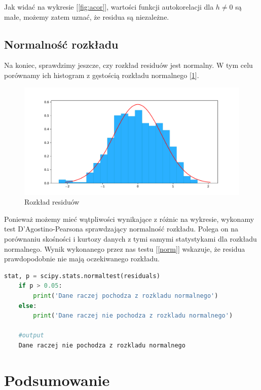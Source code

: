 \documentclass{article}
\theoremstyle{break}
\begin{document}
Jak widać na wykresie [\ref{fig:acor}], wartości funkcji autokorelacji dla $h \neq 0$ są małe, możemy zatem uznać, że residua są niezależne.

\subsection{Normalność rozkładu}

Na koniec, sprawdzimy jeszcze, czy rozkład residuów jest normalny. W tym celu porównamy ich histogram z gęstością rozkładu normalnego [\ref{fig:res_hist}]. 
\begin{figure}[H]
	\begin{center}
		\includegraphics[scale=0.5]{res_hist.pdf}
		\caption{Rozkład residuów}
		\label{fig:res_hist}
	\end{center}
\end{figure}

 Ponieważ możemy mieć wątpliwości wynikające z różnic na wykresie, wykonamy test D'Agostino-Pearsona sprawdzający normalność rozkładu. Polega on na porównaniu skośności i kurtozy danych z tymi samymi statystykami dla rozkładu normalnego. Wynik wykonanego przez nas testu [\ref{norm}] wskazuje, że residua prawdopodobnie nie mają oczekiwanego rozkładu.


\begin{lstlisting}[language=Python, caption=Test D'Agostino-Pearsona, label={norm}]
	stat, p = scipy.stats.normaltest(residuals)
	if p > 0.05:
		print('Dane raczej pochodza z rozkladu normalnego')
	else:
		print('Dane raczej nie pochodza z rozkladu normalnego')
		
	#output
	Dane raczej nie pochodza z rozkladu normalnego
\end{lstlisting}

	
\section{Podsumowanie}
\end{document}
